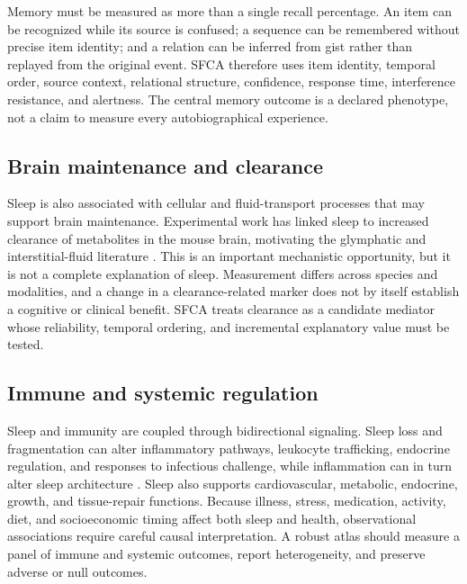 \documentclass[conference]{IEEEtran}
\begin{document}
Memory must be measured as more than a single recall percentage. An item can be recognized while its source is confused; a sequence can be remembered without precise item identity; and a relation can be inferred from gist rather than replayed from the original event. SFCA therefore uses item identity, temporal order, source context, relational structure, confidence, response time, interference resistance, and alertness. The central memory outcome is a declared phenotype, not a claim to measure every autobiographical experience.

\subsection{Brain maintenance and clearance}
Sleep is also associated with cellular and fluid-transport processes that may support brain maintenance. Experimental work has linked sleep to increased clearance of metabolites in the mouse brain, motivating the glymphatic and interstitial-fluid literature \cite{Xie2013,Nedergaard2020}. This is an important mechanistic opportunity, but it is not a complete explanation of sleep. Measurement differs across species and modalities, and a change in a clearance-related marker does not by itself establish a cognitive or clinical benefit. SFCA treats clearance as a candidate mediator whose reliability, temporal ordering, and incremental explanatory value must be tested.

\subsection{Immune and systemic regulation}
Sleep and immunity are coupled through bidirectional signaling. Sleep loss and fragmentation can alter inflammatory pathways, leukocyte trafficking, endocrine regulation, and responses to infectious challenge, while inflammation can in turn alter sleep architecture \cite{Besedovsky2019,Irwin2015}. Sleep also supports cardiovascular, metabolic, endocrine, growth, and tissue-repair functions. Because illness, stress, medication, activity, diet, and socioeconomic timing affect both sleep and health, observational associations require careful causal interpretation. A robust atlas should measure a panel of immune and systemic outcomes, report heterogeneity, and preserve adverse or null outcomes.
\end{document}
